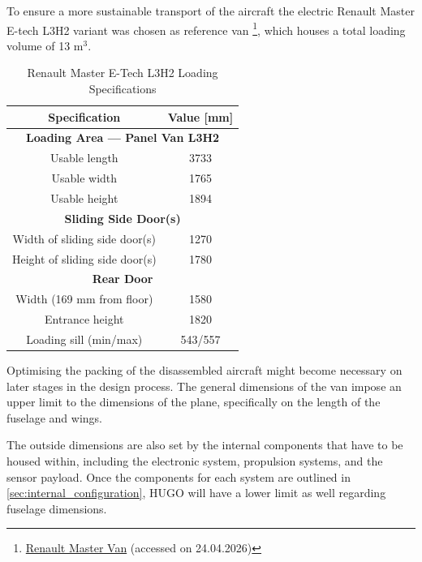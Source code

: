 To ensure a more sustainable transport of the aircraft the electric Renault Master E-tech L3H2 variant was chosen as reference van \footnote{\href{https://business.renault.co.uk/master-range/master-panel-van.html}{Renault Master Van} (accessed on 24.04.2026)}, which houses a total loading volume of 13 m$^3$.
\begin{table}[H]
    \centering
    \caption{Renault Master E-Tech L3H2 Loading Specifications }
    \begin{tabular}{|c|c|}
        \hline
        \textbf{Specification} & \textbf{Value [mm]} \\
        \hline\hline
        \multicolumn{2}{|c|}{\textbf{Loading Area — Panel Van L3H2}} \\
        \hline
        Usable length & 3733 \\
        \hline
        \hline
        Usable width & 1765  \\
        \hline
        Usable height & 1894 \\
        \hline
        \multicolumn{2}{|c|}{\textbf{Sliding Side Door(s)}} \\
        \hline
        Width of sliding side door(s) & 1270 \\
        \hline
        Height of sliding side door(s) & 1780 \\
        \hline
        \multicolumn{2}{|c|}{\textbf{Rear Door}} \\
        \hline
        Width (169 mm from floor) & 1580 \\
        \hline
        Entrance height & 1820 \\
        \hline
        Loading sill (min/max) & 543/557 \\
        \hline
    \end{tabular}
    \label{tab:renault_master_specs}
\end{table}
Optimising the packing of the disassembled aircraft might become necessary on later stages in the design process. The general dimensions of the van impose an upper limit to the dimensions of the plane, specifically on the length of the fuselage and wings.

The outside dimensions are also set by the internal components that have to be housed within, including the electronic system, propulsion systems, and the sensor payload. Once the components for each system are outlined in \autoref{sec:internal_configuration}, HUGO will have a lower limit as well regarding fuselage dimensions. 

